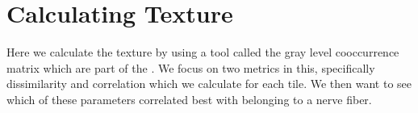\documentclass[letterpaper,10pt,english]{sphinxmanual}
\begin{document}
\noindent{}


\section{Calculating Texture}
\label{\detokenize{06-AdvancedShapeAndTexture:calculating-texture}}
\sphinxAtStartPar
Here we calculate the texture by using a tool called the gray level co\sphinxhyphen{}occurrence matrix which are part of the . We focus on two metrics in this, specifically dissimilarity and correlation which we calculate for each tile. We then want to see which of these parameters correlated best with belonging to a nerve fiber.
\end{document}

